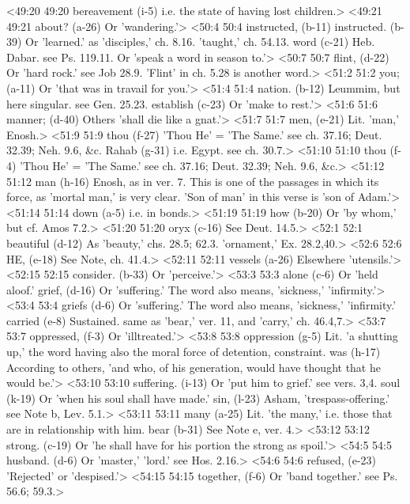 <49:20 49:20  bereavement (i-5)  i.e. the state of having lost children.>
<49:21 49:21  about? (a-26)  Or 'wandering.'>
<50:4 50:4  instructed, (b-11)  instructed. (b-39)
  Or 'learned.' as 'disciples,' ch. 8.16. 'taught,' ch. 54.13.
  word (c-21)  Heb. Dabar. see Ps. 119.11. Or 'speak a word in season to.'>
<50:7 50:7  flint, (d-22)  Or 'hard rock.' see Job 28.9. 'Flint' in ch. 5.28 is another  word.>
<51:2 51:2  you; (a-11)  Or 'that was in travail for you.'>
<51:4 51:4  nation. (b-12)  Leummim, but here singular. see Gen. 25.23.
  establish (c-23)  Or 'make to rest.'>
<51:6 51:6  manner; (d-40)  Others 'shall die like a gnat.'>
<51:7 51:7  men, (e-21)  Lit. 'man,' Enosh.>
<51:9 51:9  thou (f-27) 'Thou He' = 'The Same.' see ch. 37.16; Deut. 32.39; Neh. 9.6, &c.
  Rahab (g-31)  i.e. Egypt. see ch. 30.7.>
<51:10 51:10  thou (f-4)  'Thou He' = 'The Same.' see ch. 37.16; Deut. 32.39; Neh. 9.6,  &c.>
<51:12 51:12  man (h-16)  Enosh, as in ver. 7. This is one of the passages in which  its force, as 'mortal man,' is very clear. 'Son of man' in this  verse is 'son of Adam.'>
<51:14 51:14  down (a-5)  i.e. in bonds.>
<51:19 51:19  how (b-20)  Or 'by whom,' but cf. Amos 7.2.>
<51:20 51:20  oryx (c-16)  See Deut. 14.5.>
<52:1 52:1  beautiful (d-12)  As 'beauty,' chs. 28.5; 62.3. 'ornament,' Ex. 28.2,40.>
<52:6 52:6  HE, (e-18)  See Note, ch. 41.4.>
<52:11 52:11  vessels (a-26)  Elsewhere 'utensils.'>
<52:15 52:15  consider. (b-33)  Or 'perceive.'>
<53:3 53:3  alone (c-6)  Or 'held aloof.'
  grief, (d-16)  Or 'suffering.' The word also means, 'sickness,' 'infirmity.'>
<53:4 53:4  griefs (d-6)  Or 'suffering.' The word also means, 'sickness,' 'infirmity.'
  carried (e-8)  Sustained. same as 'bear,' ver. 11, and 'carry,' ch. 46.4,7.>
<53:7 53:7  oppressed, (f-3)  Or 'illtreated.'>
<53:8 53:8  oppression (g-5)  Lit. 'a shutting up,' the word having also the moral force of  detention, constraint.
  was (h-17)  According to others, 'and who, of his generation, would have  thought that he would be.'>
<53:10 53:10  suffering. (i-13)  Or 'put him to grief.' see vers. 3,4.
  soul (k-19)  Or 'when his soul shall have made.'
  sin, (l-23)  Asham, 'trespass-offering.' see Note b, Lev. 5.1.>
<53:11 53:11  many (a-25)  Lit. 'the many,' i.e. those that are in relationship with  him.
  bear (b-31)  See Note e, ver. 4.>
<53:12 53:12  strong. (c-19)  Or 'he shall have for his portion the strong as spoil.'>
<54:5 54:5  husband. (d-6)  Or 'master,' 'lord.' see Hos. 2.16.>
<54:6 54:6  refused, (e-23)  'Rejected' or 'despised.'>
<54:15 54:15  together, (f-6)  Or 'band together.' see Ps. 56.6; 59.3.>
